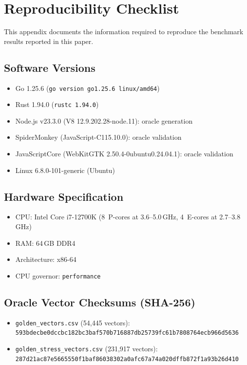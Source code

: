 \section{Reproducibility Checklist}
\label{sec:appendix-reproducibility}

This appendix documents the information required to reproduce the
benchmark results reported in this paper.

\subsection*{Software Versions}

\begin{itemize}
\item Go 1.25.6 (\texttt{go version go1.25.6 linux/amd64})
\item Rust 1.94.0 (\texttt{rustc 1.94.0})
\item Node.js v23.3.0 (V8 12.9.202.28-node.11): oracle generation
\item SpiderMonkey (JavaScript-C115.10.0): oracle validation
\item JavaScriptCore (WebKitGTK 2.50.4-0ubuntu0.24.04.1): oracle validation
\item Linux 6.8.0-101-generic (Ubuntu)
\end{itemize}

\subsection*{Hardware Specification}

\begin{itemize}
\item CPU: Intel Core i7-12700K (8~P-cores at 3.6--5.0\,GHz, 4~E-cores at 2.7--3.8\,GHz)
\item RAM: 64\,GB DDR4
\item Architecture: x86-64
\item CPU governor: \texttt{performance}
\end{itemize}

\subsection*{Oracle Vector Checksums (SHA-256)}

\begin{itemize}
\item \texttt{golden\_vectors.csv} (54{,}445 vectors):\\
  \texttt{593bdecbe0dccbc182bc3baf570b716887db25739fc61b7808764ecb966d5636}
\item \texttt{golden\_stress\_vectors.csv} (231{,}917 vectors):\\
  \texttt{287d21ac87e5665550f1baf86038302a0afc67a74a020dffb872f1a93b26d410}
\end{itemize}

